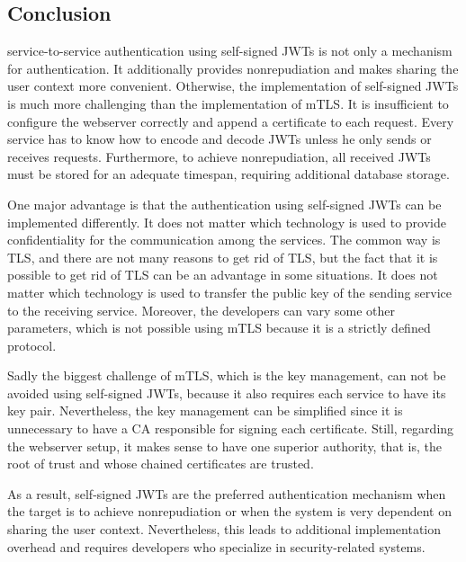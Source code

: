 \subsection{Conclusion}
service-to-service authentication using self-signed JWTs is not only a mechanism for authentication. It additionally provides nonrepudiation and makes sharing the user context more convenient. 
Otherwise, the implementation of self-signed JWTs is much more challenging than the implementation of mTLS.
It is insufficient to configure the webserver correctly and append a certificate to each request.
Every service has to know how to encode and decode JWTs unless he only sends or receives requests.
Furthermore, to achieve nonrepudiation, all received JWTs must be stored for an adequate timespan, requiring additional database storage.

One major advantage is that the authentication using self-signed JWTs can be implemented differently.
It does not matter which technology is used to provide confidentiality for the communication among the services.
The common way is TLS, and there are not many reasons to get rid of TLS, but the fact that it is possible to get rid of TLS can be an advantage in some situations.
It does not matter which technology is used to transfer the public key of the sending service to the receiving service.
Moreover, the developers can vary some other parameters, which is not possible using mTLS because it is a strictly defined protocol.

Sadly the biggest challenge of mTLS, which is the key management, can not be avoided using self-signed JWTs, because it also requires each service to have its key pair.
Nevertheless, the key management can be simplified since it is unnecessary to have a CA responsible for signing each certificate.
Still, regarding the webserver setup, it makes sense to have one superior authority, that is, the root of trust and whose chained certificates are trusted.

As a result, self-signed JWTs are the preferred authentication mechanism when the target is to achieve nonrepudiation or when the system is very dependent on sharing the user context.
Nevertheless, this leads to additional implementation overhead and requires developers who specialize in security-related systems.
